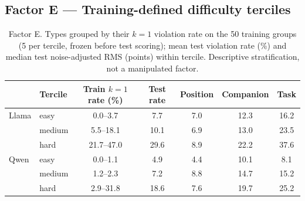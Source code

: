 \subsection*{Factor E --- Training-defined difficulty terciles}
\begin{table}[h]
\centering\scriptsize
\caption{Factor E. Types grouped by their $k=1$ violation rate on the 50 training groups (5 per tercile, frozen before test scoring); mean test violation rate (\%) and median test noise-adjusted RMS (points) within tercile. Descriptive stratification, not a manipulated factor.}
\label{tab:E}
\begin{tabular}{llccccc}
\toprule
 & Tercile & Train $k{=}1$ rate (\%) & Test rate & Position & Companion & Task \\
\midrule
Llama & easy & 0.0--3.7 & 7.7 & 7.0 & 12.3 & 16.2 \\
 & medium & 5.5--18.1 & 10.1 & 6.9 & 13.0 & 23.5 \\
 & hard & 21.7--47.0 & 29.6 & 8.9 & 22.2 & 37.6 \\
\midrule
Qwen & easy & 0.0--1.1 & 4.9 & 4.4 & 10.1 & 8.1 \\
 & medium & 1.2--2.3 & 7.2 & 8.8 & 14.7 & 15.2 \\
 & hard & 2.9--31.8 & 18.6 & 7.6 & 19.7 & 25.2 \\
\bottomrule
\end{tabular}
\end{table}

